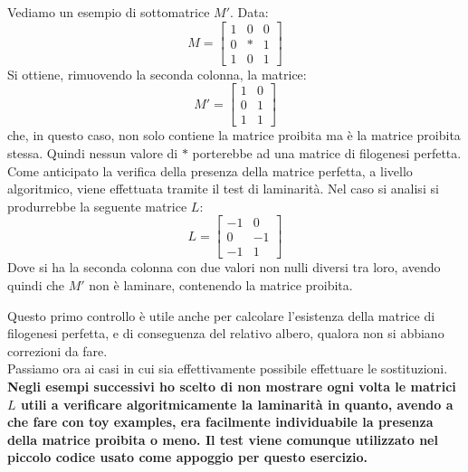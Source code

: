 \documentclass[a4paper,12pt, oneside]{book}
\begin{document}
\begin{esempio}
  Vediamo un esempio di sottomatrice $M'$.
  Data:
  \[
    M=\left[
      \begin{matrix}
        1 & 0 & 0\\
        0 & * & 1\\
        1 & 0 & 1
      \end{matrix}
    \right]
  \]
  Si ottiene, rimuovendo la seconda colonna, la matrice:
  \[
    M'=\left[
      \begin{matrix}
        1 & 0\\
        0 & 1\\
        1 & 1
      \end{matrix}
    \right]
  \]
  che, in questo caso, non solo contiene la matrice proibita ma è la matrice
  proibita stessa. Quindi nessun valore di $*$ porterebbe ad una
  matrice di filogenesi perfetta.\\
  Come anticipato la verifica della presenza della matrice perfetta, a livello
  algoritmico, viene effettuata tramite il test di laminarità. Nel caso si
  analisi si produrrebbe la seguente matrice $L$:
  \[
    L=\left[
      \begin{matrix}
        -1 & 0\\
        0 & -1\\
        -1 & 1
      \end{matrix}
    \right]
  \]
  Dove si ha la seconda colonna con due valori non nulli diversi tra loro,
  avendo quindi che $M'$ non è laminare, contenendo la matrice proibita.
\end{esempio}
\noindent
Questo primo controllo è utile anche per calcolare l'esistenza della matrice di
filogenesi perfetta, e di conseguenza del relativo albero, qualora non si
abbiano correzioni da fare.\\
Passiamo ora ai casi in cui sia effettivamente possibile effettuare le
sostituzioni.\\
\textbf{Negli esempi successivi ho scelto di non mostrare ogni volta le matrici
  $L$ utili a verificare algoritmicamente la laminarità in quanto, avendo a che
  fare con toy examples, era facilmente individuabile la presenza della matrice
  proibita o meno. Il test viene comunque utilizzato nel piccolo codice usato
  come appoggio per questo esercizio.}
\end{document}

